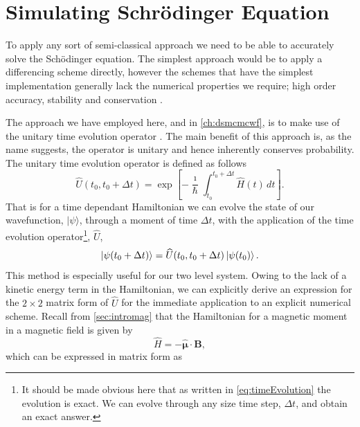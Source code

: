 \section{Simulating Schr\"odinger Equation}

To apply any sort of semi-classical approach we need to be able to accurately solve the Sch\"odinger equation.
The simplest approach would be to apply a differencing scheme directly, however the schemes that have the simplest implementation generally lack the numerical properties we require; high order accuracy, stability and conservation \cite{mi_eng}. %

The approach we have employed here, and in \autoref{ch:dsmcmcwf}, is to make use of the unitary time evolution operator \cite{?}.
The main benefit of this approach is, as the name suggests, the operator is unitary and hence inherently conserves probability.
The unitary time evolution operator is defined as follows
\begin{equation}
    \widehat{U}(t_0,t_0+\Delta t) = \exp\left[-\frac{\imath}{\hbar}\int_{t_0}^{t_0+\Delta t} \widehat{H}(t)\,dt \right]. \label{eq:timeEvolution}
\end{equation}
That is for a time dependant Hamiltonian we can evolve the state of our wavefunction, $\vert \psi \rangle$, through a moment of time $\Delta t$, with the application of the time evolution operator\footnote{It should be made obvious here that as written in \autoref{eq:timeEvolution} the evolution is exact. We can evolve through any size time step, $\Delta t$, and obtain an exact answer.}, $\widehat{U}$,
\begin{equation*}
    \ket{ \psi (t_0+\Delta t) } = \widehat{U}(t_0,t_0+\Delta t) \ket{ \psi (t_0) }.
\end{equation*}
This method is especially useful for our two level system.
Owing to the lack of a kinetic energy term in the Hamiltonian, we can explicitly derive an expression for the $2\times2$ matrix form of $\widehat{U}$ for the immediate application to an explicit numerical scheme.
Recall from \autoref{sec:intromag} that the Hamiltonian for a magnetic moment in a magnetic field is given by
\begin{equation*}
    \widehat{H} = -\hat{\boldsymbol{\mu}} \cdot \mathbf{B},
\end{equation*}
which can be expressed in matrix form as

